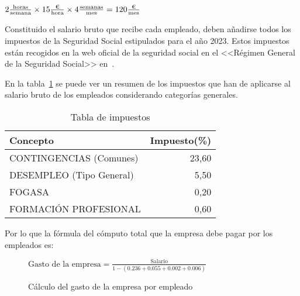 \begin{center}
$2 \frac{\text{horas}}{\text{semana}} \times 15 \frac{\text{\texteuro}}{\text{hora}} \times 4
\frac{\text{semanas}}{\text{mes}} = 120\frac{\text{\texteuro}}{\text{mes}} $
\end{center}


Constituido el salario bruto que recibe cada empleado, deben añadirse todos los
impuestos de la Seguridad Social estipulados para el año 2023. Estos impuestos
están recogidos en la web oficial de la seguridad social en el <<Régimen General
de la Seguridad Social>> en~\cite{cotizacion2023}.

En la tabla~\ref{tabla:seg-social} se puede ver un resumen de los impuestos que
han de aplicarse al salario bruto de los empleados considerando categorías
generales.

\begin{table}[H]
    \centering
    \begin{tabular}{lr}
        \toprule
    \textbf{Concepto}           & \textbf{Impuesto(\%)} \\ \midrule
    CONTINGENCIAS   (Comunes)   & 23,60 \\
    DESEMPLEO  (Tipo General)   & 5,50 \\
    FOGASA                      & 0,20  \\
    FORMACIÓN PROFESIONAL       & 0,60 \\ \bottomrule
    \end{tabular}%
    \caption{Tabla de impuestos}
    \label{tabla:seg-social}
\end{table}

Por lo que la fórmula del cómputo total que la empresa debe pagar por los
empleados es:

\begin{figure}[H]
\begin{center}
    $\text{Gasto de la empresa} = \frac{\text{Salario}}{1-(0.236+0.055+0.002+0.006)}$
\end{center}
\caption{Cálculo del gasto de la empresa por empleado}
\end{figure}



